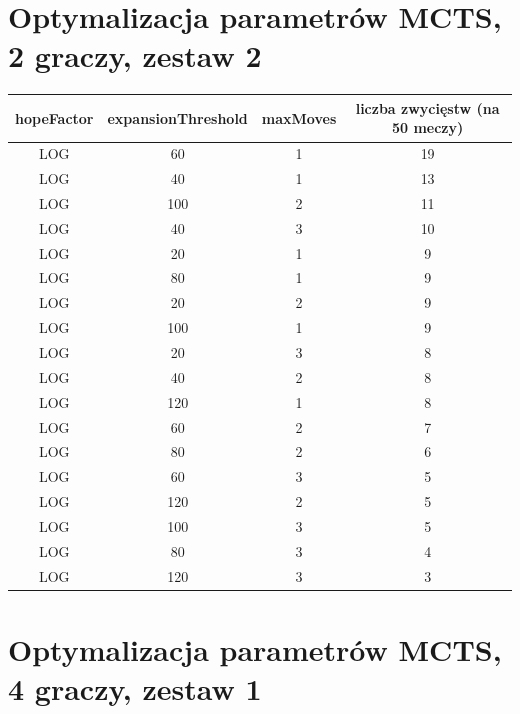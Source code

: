 \documentclass{pracamgr}
\begin{document}
\begin{appendices}
\vfill
\hspace{0pt}
\pagebreak

\section{Optymalizacja parametrów MCTS, 2 graczy, zestaw 2\label{results-2-2p}}

\begin{center}
    \begin{tabular}{| c | c | c | c |}
	\hline
    hopeFactor & expansionThreshold & maxMoves & liczba zwycięstw (na 50 meczy) \\ \hline
	\hline

        LOG & 60 & 1 & 19 \\ \hline
        LOG & 40 & 1 & 13 \\ \hline
        LOG & 100 & 2 & 11 \\ \hline
        LOG & 40 & 3 & 10 \\ \hline
        LOG & 20 & 1 & 9 \\ \hline
        LOG & 80 & 1 & 9 \\ \hline
        LOG & 20 & 2 & 9 \\ \hline
        LOG & 100 & 1 & 9 \\ \hline
        LOG & 20 & 3 & 8 \\ \hline
        LOG & 40 & 2 & 8 \\ \hline
        LOG & 120 & 1 & 8 \\ \hline
        LOG & 60 & 2 & 7 \\ \hline
        LOG & 80 & 2 & 6 \\ \hline
        LOG & 60 & 3 & 5 \\ \hline
        LOG & 120 & 2 & 5 \\ \hline
        LOG & 100 & 3 & 5 \\ \hline
        LOG & 80 & 3 & 4 \\ \hline
        LOG & 120 & 3 & 3 \\ \hline

    \end{tabular}
\end{center}

\vfill
\hspace{0pt}
\pagebreak

\section{Optymalizacja parametrów MCTS, 4 graczy, zestaw 1\label{results-1-4p}}


\end{appendices}
\end{document}
